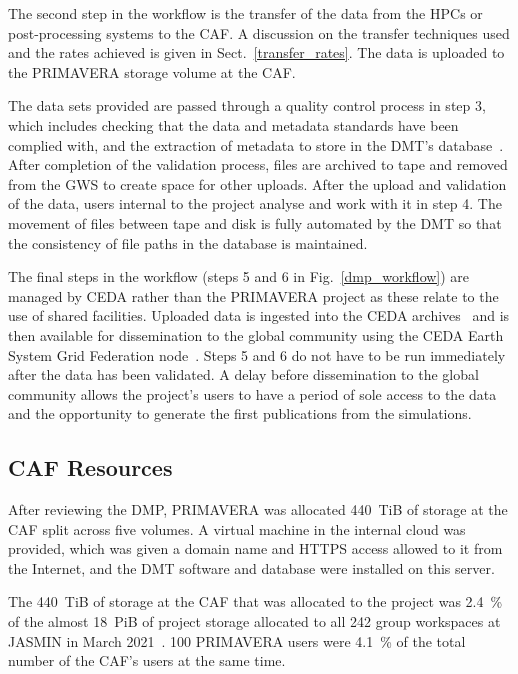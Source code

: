 \documentclass[gmd, manuscript]{copernicus}
\begin{document}
The second step in the workflow is the transfer of the data from the HPCs or post-processing systems to the CAF. A discussion on the transfer techniques used and the rates achieved is given in Sect.~\ref{transfer_rates}. The data is uploaded to the PRIMAVERA storage volume at the CAF.

The data sets provided are passed through a quality control process in step 3, which includes checking that the data and metadata standards have been complied with, and the extraction of metadata to store in the DMT's database~\citep{Seddon2020}. After completion of the validation process, files are archived to tape and removed from the GWS to create space for other uploads. After the upload and validation of the data, users internal to the project analyse and work with it in step 4. The movement of files between tape and disk is fully automated by the DMT so that the consistency of file paths in the database is maintained.

The final steps in the workflow (steps 5 and 6 in Fig.~\ref{dmp_workflow}) are managed by CEDA rather than the PRIMAVERA project as these relate to the use of shared facilities. Uploaded data is ingested into the CEDA archives~\citep{CEDAArchive} and is then available for dissemination to the global community using the CEDA Earth System Grid Federation node~\citep{CEDAESGF}. Steps 5 and 6 do not have to be run immediately after the data has been validated. A delay before dissemination to the global community allows the project's users to have a period of sole access to the data and the opportunity to generate the first publications from the simulations.


\subsection{CAF Resources}

After reviewing the DMP, PRIMAVERA was allocated 440~TiB of storage at the CAF split across five volumes. A virtual machine in the internal cloud was provided, which was given a domain name and HTTPS access allowed to it from the Internet, and the DMT software and database were installed on this server.

The 440~TiB of storage at the CAF that was allocated to the project was 2.4~\% of the almost 18~PiB of project storage allocated to all 242 group workspaces at JASMIN in March 2021~\citep{Townsend2021}. 100 PRIMAVERA users were 4.1~\% of the total number of the CAF's users at the same time. 
\end{document}
